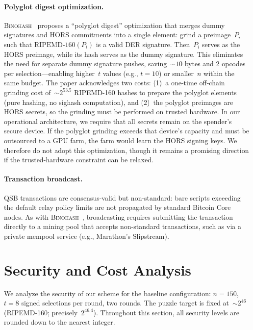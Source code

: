 \documentclass[11pt, a4paper]{article}
\begin{document}
\paragraph{Polyglot digest optimization.}
\textsc{Binohash}~\cite[Appendix~D]{linus2024binohash} proposes a ``polyglot digest'' optimization that merges dummy signatures and HORS commitments into a single element: grind a preimage~$P_i$ such that $\text{RIPEMD-160}(P_i)$ is a valid DER signature. Then~$P_i$ serves as the HORS preimage, while its hash serves as the dummy signature. This eliminates the need for separate dummy signature pushes, saving~${\sim}10$ bytes and 2 opcodes per selection---enabling higher~$t$ values (e.g., $t = 10$) or smaller~$n$ within the same budget. The paper acknowledges two costs: (1)~a one-time off-chain grinding cost of~${\sim}2^{53.5}$ RIPEMD-160 hashes to prepare the polyglot elements (pure hashing, no sighash computation), and (2)~the polyglot preimages are HORS secrets, so the grinding must be performed on trusted hardware. In our operational architecture, we require that all secrets remain on the spender's secure device. If the polyglot grinding exceeds that device's capacity and must be outsourced to a GPU farm, the farm would learn the HORS signing keys. We therefore do not adopt this optimization, though it remains a promising direction if the trusted-hardware constraint can be relaxed.

\paragraph{Transaction broadcast.}
QSB transactions are consensus-valid but non-standard: bare scripts exceeding the default relay policy limits are not propagated by standard Bitcoin Core nodes. As with \textsc{Binohash}~\cite[Section~6]{linus2024binohash}, broadcasting requires submitting the transaction directly to a mining pool that accepts non-standard transactions, such as via a private mempool service (e.g., Marathon's Slipstream).

\section{Security and Cost Analysis}
\label{sec:security-cost}

We analyze the security of our scheme for the baseline configuration: $n = 150$, $t = 8$ signed selections per round, two rounds. The puzzle target is fixed at~${\sim}2^{46}$ (RIPEMD-160; precisely~$2^{46.4}$). Throughout this section, all security levels are rounded down to the nearest integer.
\end{document}
